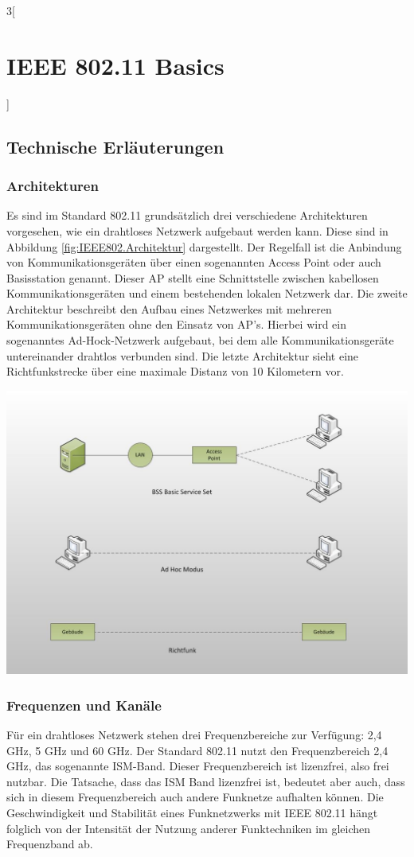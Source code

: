 \begin{multicols}{3}[\section{IEEE 802.11 Basics}]
\subsection*{Technische Erläuterungen}
\subsubsection*{Architekturen}  
Es sind im Standard 802.11 grundsätzlich drei verschiedene Architekturen vorgesehen, wie ein drahtloses Netzwerk aufgebaut werden kann. Diese sind in Abbildung  \ref{fig:IEEE802.Architektur} dargestellt. Der Regelfall ist die Anbindung von Kommunikationsgeräten über einen sogenannten Access Point oder auch Basisstation genannt. Dieser AP stellt eine Schnittstelle zwischen kabellosen Kommunikationsgeräten und einem bestehenden lokalen Netzwerk dar. Die zweite Architektur beschreibt den Aufbau eines Netzwerkes mit mehreren Kommunikationsgeräten ohne den Einsatz von AP’s. Hierbei wird ein sogenanntes Ad-Hock-Netzwerk aufgebaut, bei dem alle Kommunikationsgeräte untereinander drahtlos verbunden sind. Die letzte Architektur sieht eine Richtfunkstrecke über eine maximale Distanz von 10 Kilometern vor. ~\cite{basics.3}
\begin{Figure}
\includegraphics[width=\linewidth]{Kapitel/IEEE802.11/Grafiken/80211_Architektur.jpg}
\label{fig:IEEE802.Architektur}
\end{Figure}

\subsubsection*{Frequenzen und Kanäle}  
Für ein drahtloses Netzwerk stehen drei Frequenzbereiche zur Verfügung: 2,4 GHz, 5 GHz und 60 GHz. Der Standard 802.11 nutzt den Frequenzbereich 2,4 GHz, das sogenannte ISM-Band. Dieser Frequenzbereich ist lizenzfrei, also frei nutzbar. Die Tatsache, dass das ISM Band lizenzfrei ist, bedeutet aber auch, dass sich in diesem Frequenzbereich auch andere Funknetze aufhalten können. Die Geschwindigkeit und Stabilität eines Funknetzwerks mit IEEE 802.11 hängt folglich von der Intensität der Nutzung anderer Funktechniken im gleichen Frequenzband ab. 


\end{multicols}
